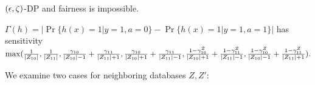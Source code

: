 \begin{lemma}
  $(\epsilon, \zeta)$-DP and fairness is impossible. 
\end{lemma}




\begin{lemma} $\Gamma(h) = |\Pr\{h(x) = 1 | y=1, a =0\} - \Pr\{h(x) = 1 | y = 1, a = 1\}|$ has sensitivity $\max(\frac{1}{|Z_{10}|},\frac{1}{|Z_{11}|},
	\frac{\gamma_{10}}{|Z_{10}|-1} + \frac{\gamma_{11}}{|Z_{11}|+1},
	\frac{\gamma_{10}}{|Z_{10}|+1} + \frac{\gamma_{11}}{|Z_{11}|-1},
	\frac{1 - \gamma_{10}^Z}{|Z_{10}|+1} + \frac{1 - \gamma_{11}^Z}{|Z_{11}|-1},
	\frac{1 - \gamma_{10}^Z}{|Z_{10}|-1} + \frac{1 - \gamma_{11}^Z}{|Z_{11}|+1}).
	$
\end{lemma}

We examine two cases for neighboring databases $Z, Z'$:
